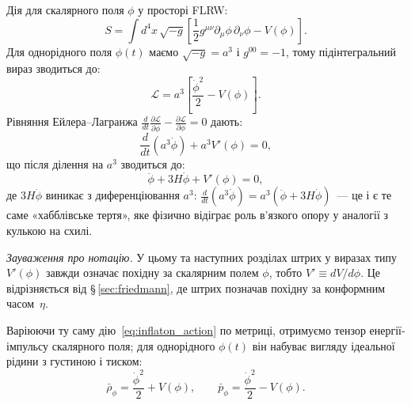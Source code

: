 \documentclass[12pt, a4paper]{article}
\begin{document}
Дія для скалярного поля $\phi$ у просторі FLRW:
\begin{equation}\label{eq:inflaton_action}
  S = \int d^4x\,\sqrt{-g}\left[\frac{1}{2}g^{\mu\nu}\partial_\mu\phi\,\partial_\nu\phi - V(\phi)\right].
\end{equation}
Для однорідного поля $\phi(t)$ маємо $\sqrt{-g} = a^3$ і $g^{00} = -1$,
тому підінтегральний вираз зводиться до:
\begin{equation*}
  \mathcal{L} = a^3\!\left[\frac{\dot{\phi}^2}{2} - V(\phi)\right].
\end{equation*}
Рівняння Ейлера--Лагранжа $\frac{d}{dt}\frac{\partial\mathcal{L}}{\partial\dot{\phi}} - \frac{\partial\mathcal{L}}{\partial\phi} = 0$ дають:
\begin{equation*}
  \frac{d}{dt}\!\left(a^3\dot{\phi}\right) + a^3 V'(\phi) = 0,
\end{equation*}
що після ділення на $a^3$ зводиться до:
\begin{equation}\label{eq:klein_gordon}
    \ddot{\phi} +3H\dot{\phi} + V'(\phi) = 0,
\end{equation}
де $3H\dot{\phi}$ виникає з диференціювання $a^3$:
$\frac{d}{dt}(a^3\dot{\phi}) = a^3(\ddot{\phi} + 3H\dot{\phi})$~---
це і є те саме «хабблівське тертя», яке фізично відіграє роль
в'язкого опору у аналогії з кулькою на схилі.

\textit{Зауваження про нотацію.} У цьому та наступних розділах
штрих у виразах типу $V'(\phi)$ завжди означає похідну за
скалярним полем $\phi$, тобто $V' \equiv dV/d\phi$. Це відрізняється
від §\,\ref{sec:friedmann}, де штрих позначав похідну за конформним
часом~$\eta$.

Варіюючи ту саму дію~\eqref{eq:inflaton_action} по метриці,
отримуємо тензор енергії-імпульсу скалярного поля; для
однорідного $\phi(t)$ він набуває вигляду ідеальної рідини
з густиною і тиском:
\begin{equation}\label{eq:inflaton_rho_p}
  \bar{\rho}_\phi = \frac{\dot{\phi}^2}{2} + V(\phi),
  \qquad
  \bar{p}_\phi   = \frac{\dot{\phi}^2}{2} - V(\phi).
\end{equation}
\end{document}
